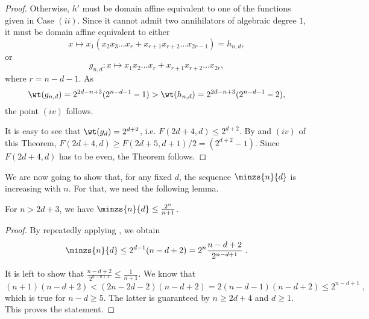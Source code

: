 \begin{proof}
Otherwise, $h'$ must be domain affine equivalent to one of the functions given in Case $(ii)$. Since it cannot admit two annihilators of algebraic degree $1$, it must be domain affine equivalent to either
$$
x \mapsto x_1(x_2x_3\dots x_{r} + x_{r+1}x_{r+2}\dots x_{2r-1}) = h_{n,d},
$$
or
$$
g_{n,d}\colon x \mapsto x_1x_2 \dots x_{r} + x_{r+1}x_{r+2} \dots x_{2r},
$$
where $r = n-d-1$.
As
$$
\wt(g_{n,d}) = 2^{2d-n+3}(2^{n-d-1}-1) > \wt(h_{n,d})=2^{2d-n+3}(2^{n-d-1}-2),
$$
the point $(iv)$ follows.

It is easy to see that $\wt(g_d)=2^{d+2}$, i.e. $F(2d+4,d)\le 2^{d+2}$. By  and $(iv)$ of this Theorem, $F(2d+4,d) \ge F(2d+5,d+1)/2 = (2^{d+2}-1)$. Since $F(2d+4,d)$ has to be even, the Theorem follows.
\end{proof}



We are now going to show that, for any fixed $d$, the sequence $\minzs{n}{d}$ is increasing with $n$. For that, we need the following lemma.
\begin{lemma}
For $n > 2d+3$, we have $\minzs{n}{d} \leq \frac{2^n}{n+1}$.
\end{lemma}
\begin{proof}
By repeatedly applying , we obtain
\[\minzs{n}{d} \leq 2^{d-1}(n-d+2) = 2^n \frac{n-d+2}{2^{n-d+1}}\;.\]

It is left to show that $\frac{n-d+2}{2^{n-d+1}} \leq \frac{1}{n+1}$. We know that
\[(n+1)(n-d+2) < (2n-2d-2)(n-d+2) = 2(n-d-1)(n-d+2) \leq 2^{n-d+1}\;,\]
which is true for $n - d \geq 5$. The latter is guaranteed by $n \ge 2d + 4$ and $d \ge 1$. This proves the statement.
\end{proof}

